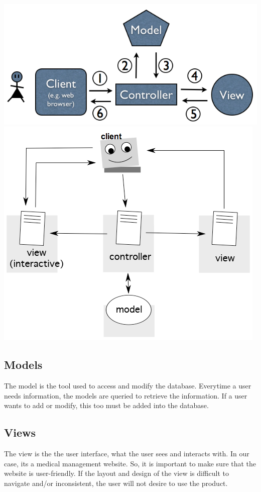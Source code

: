 \documentclass[12pt]{report}
\begin{document}
\includegraphics[scale=1]{mvc-diagram4.png}\\
\includegraphics[scale=1]{MVC-Diagram.jpg}\\

\subsection{Models}
The model is the tool used to access and modify the database. Everytime a user needs information, the models are queried to retrieve the information. If a user wants to add or modify, this too must be added into the database. 

\subsection{Views}
The view is the the user interface, what the user sees and interacts with. In our case, its a medical management website. So, it is important to make sure that the website is user-friendly. If the layout and design of the view is difficult to navigate and/or inconsistent, the user will not desire to use the product. 
\end{document}
